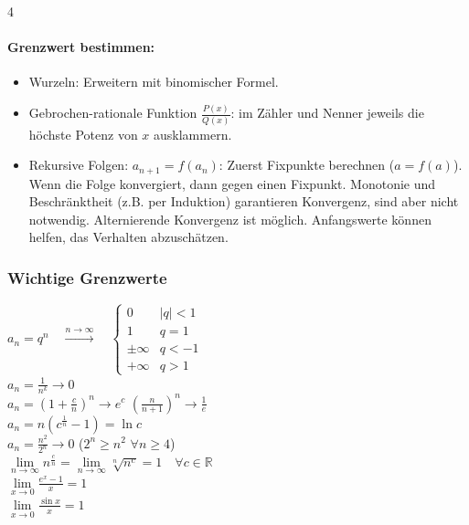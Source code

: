 \documentclass[6pt,a4paper]{scrartcl}
\newcommand{\ra}[0]{\ensuremath{\rightarrow}}
\begin{document}
\begin{multicols*}{4}
    \paragraph{Grenzwert bestimmen:}
    \begin{itemize}\itemsep0pt
        \item Wurzeln: Erweitern mit binomischer Formel.
        \item Gebrochen-rationale Funktion $\frac{P(x)}{Q(x)}$: im Zähler und Nenner jeweils die höchste Potenz von $x$ ausklammern.
        \item Rekursive Folgen: $a_{n+1} = f(a_n)$: Zuerst Fixpunkte berechnen ($a = f(a)$). Wenn die Folge konvergiert, dann gegen einen Fixpunkt. Monotonie und Beschränktheit (z.B. per Induktion) garantieren Konvergenz, sind aber nicht notwendig. Alternierende Konvergenz ist möglich. Anfangswerte können helfen, das Verhalten abzuschätzen.
    \end{itemize}

    \begin{sectionbox}
        \subsubsection{Wichtige Grenzwerte}
        $a_n=q^n \quad \overset{n \rightarrow \infty}{\longrightarrow} \quad \begin{cases} 0 & |q|<1 \\ 1 & q=1 \\ \pm \infty & q < -1  \\  + \infty & q > 1\end{cases}$ \\
        $a_n=\frac{1}{n^k}\rightarrow 0$\\
        $a_n=\left(1+\frac{c}{n}\right)^n \rightarrow e^c$ \qquad $\left(\frac{n}{n+1}\right)^n \rightarrow \frac{1}{e} $ \\
        $a_n=n\left(c^{\frac1{n}}-1\right) = \ln c$\\
        $a_n=\frac{n^2}{2^n}\ra 0$ \qquad \qquad \qquad ($2^n \ge n^2$ \quad $\forall n\ge 4$) \\
        $\lim\limits_{n\to\infty}n^{\frac{c}{n}}=\lim\limits_{n\to\infty}\sqrt[n]{n^c}=1 \quad \forall c \in \mathbb R$\\
        $\lim\limits_{x\to 0}\frac{e^x-1}{x}=1$\\
        $\lim\limits_{x\to 0}\frac{\sin x}{x}=1$
    \end{sectionbox}



\end{multicols*}
\end{document}
